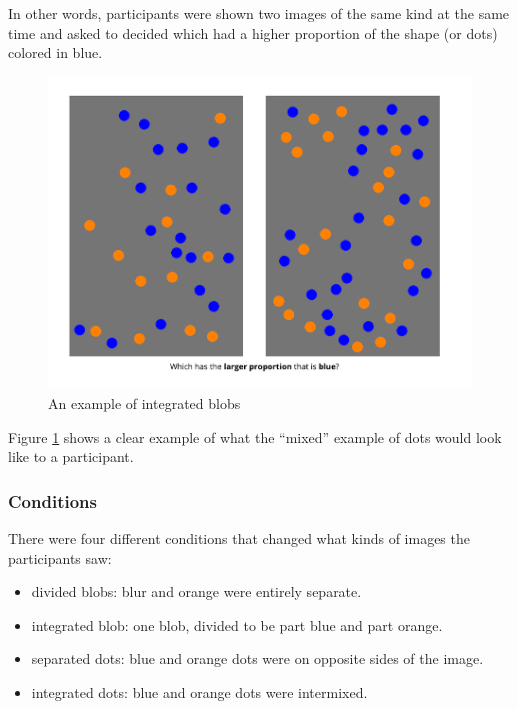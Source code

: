 \documentclass[
  man,floatsintext]{apa6}
\providecommand{\tightlist}{%
  \setlength{\itemsep}{0pt}\setlength{\parskip}{0pt}}
\begin{document}
In other words, participants were shown two images of the same kind at the same time and asked to decided which had a higher proportion of the shape (or dots) colored in blue.

\newpage

\begin{figure}[H]

{\centering \includegraphics[width=1\linewidth]{img11/Probtask_Trial} 

}

\caption{ An example of integrated blobs}\label{fig:img1}
\end{figure}

Figure \ref{fig:img1} shows a clear example of what the ``mixed'' example of dots would look like to a participant.
\newpage 

\subsubsection{\texorpdfstring{Conditions}{Conditions }}\label{conditions}

There were four different conditions that changed what kinds of images the participants saw:

\begin{itemize}
\tightlist
\item
  divided blobs: blur and orange were entirely separate.
\item
  integrated blob: one blob, divided to be part blue and part orange.
\item
  separated dots: blue and orange dots were on opposite sides of the image.
\item
  integrated dots: blue and orange dots were intermixed.
\end{itemize}
\end{document}
